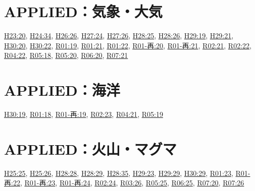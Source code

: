\section{APPLIED：気象・大気}
\hyperref[q:h23-reg-applied-20]{H23:20}, \hyperref[q:h24-reg-applied-34]{H24:34}, \hyperref[q:h26-reg-applied-26]{H26:26}, \hyperref[q:h27-reg-applied-24]{H27:24}, \hyperref[q:h27-reg-applied-26]{H27:26}, \hyperref[q:h28-reg-applied-25]{H28:25}, \hyperref[q:h28-reg-applied-26]{H28:26}, \hyperref[q:h29-reg-applied-19]{H29:19}, \hyperref[q:h29-reg-applied-21]{H29:21}, \hyperref[q:h30-reg-applied-20]{H30:20}, \hyperref[q:h30-reg-applied-22]{H30:22}, \hyperref[q:r01-reg-applied-19]{R01:19}, \hyperref[q:r01-reg-applied-21]{R01:21}, \hyperref[q:r01-reg-applied-22]{R01:22}, \hyperref[q:r01-ret-applied-20]{R01-再:20}, \hyperref[q:r01-ret-applied-21]{R01-再:21}, \hyperref[q:r02-reg-applied-21]{R02:21}, \hyperref[q:r02-reg-applied-22]{R02:22}, \hyperref[q:r04-reg-applied-22]{R04:22}, \hyperref[q:r05-reg-applied-18]{R05:18}, \hyperref[q:r05-reg-applied-20]{R05:20}, \hyperref[q:r06-reg-applied-20]{R06:20}, \hyperref[q:r07-reg-applied-21]{R07:21}
\section{APPLIED：海洋}
\hyperref[q:h30-reg-applied-19]{H30:19}, \hyperref[q:r01-reg-applied-18]{R01:18}, \hyperref[q:r01-ret-applied-19]{R01-再:19}, \hyperref[q:r02-reg-applied-23]{R02:23}, \hyperref[q:r04-reg-applied-21]{R04:21}, \hyperref[q:r05-reg-applied-19]{R05:19}
\section{APPLIED：火山・マグマ}
\hyperref[q:h25-reg-applied-25]{H25:25}, \hyperref[q:h25-reg-applied-26]{H25:26}, \hyperref[q:h28-reg-applied-28]{H28:28}, \hyperref[q:h28-reg-applied-29]{H28:29}, \hyperref[q:h28-reg-applied-35]{H28:35}, \hyperref[q:h29-reg-applied-23]{H29:23}, \hyperref[q:h29-reg-applied-29]{H29:29}, \hyperref[q:h30-reg-applied-29]{H30:29}, \hyperref[q:r01-reg-applied-23]{R01:23}, \hyperref[q:r01-ret-applied-22]{R01-再:22}, \hyperref[q:r01-ret-applied-23]{R01-再:23}, \hyperref[q:r01-ret-applied-24]{R01-再:24}, \hyperref[q:r02-reg-applied-24]{R02:24}, \hyperref[q:r03-reg-applied-26]{R03:26}, \hyperref[q:r05-reg-applied-25]{R05:25}, \hyperref[q:r06-reg-applied-25]{R06:25}, \hyperref[q:r07-reg-applied-20]{R07:20}, \hyperref[q:r07-reg-applied-26]{R07:26}
